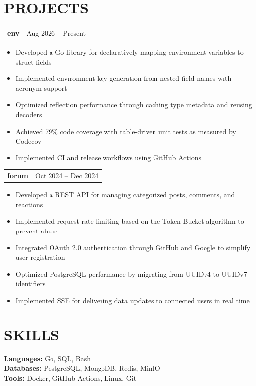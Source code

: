 \documentclass[letterpaper,11pt]{article}
\makeatletter
\newcommand{\row}[2]{
    \begin{tabular*}{\textwidth}[t]{@{}l@{\extracolsep{\fill}}r@{}}
        {#1} & {#2} \\
    \end{tabular*}%
}
\newcommand{\header}[2]{\row{\bfseries #1}{#2}}
\makeatother
\begin{document}
    \section{PROJECTS}
    \header{env}{Aug 2026 -- Present}
    \begin{itemize}
        \item Developed a Go library for declaratively mapping environment variables to struct fields
        \item Implemented environment key generation from nested field names with acronym support
        \item Optimized reflection performance through caching type metadata and reusing decoders
        \item Achieved 79\% code coverage with table-driven unit tests as measured by Codecov
        \item Implemented CI and release workflows using GitHub Actions
    \end{itemize}
    \header{forum}{Oct 2024 -- Dec 2024}
    \begin{itemize}
        \item Developed a REST API for managing categorized posts, comments, and reactions
        \item Implemented request rate limiting based on the Token Bucket algorithm to prevent abuse
        \item Integrated OAuth 2.0 authentication through GitHub and Google to simplify user registration
        \item Optimized PostgreSQL performance by migrating from UUIDv4 to UUIDv7 identifiers
        \item Implemented SSE for delivering data updates to connected users in real time
    \end{itemize}

    \section{SKILLS}
    \vspace{4pt}
    {\bfseries Languages:} Go, SQL, Bash \\
    {\bfseries Databases:} PostgreSQL, MongoDB, Redis, MinIO \\
    {\bfseries Tools:} Docker, GitHub Actions, Linux, Git \\
\end{document}
